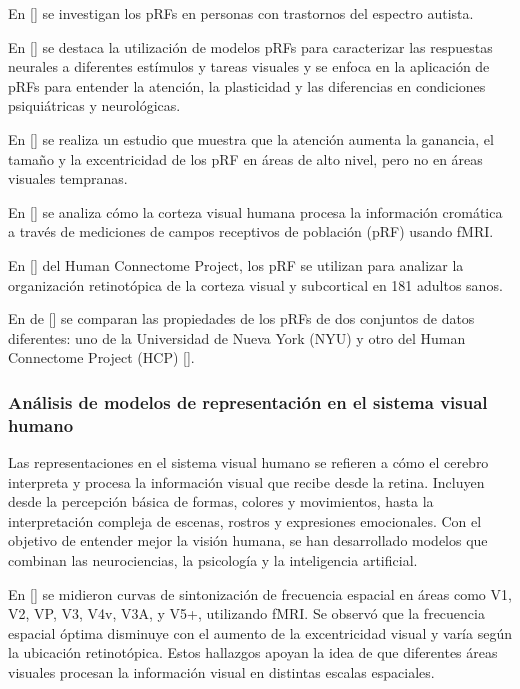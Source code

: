 En [\cite{schwarzkopf_larger_2014}] se investigan los pRFs en personas con trastornos del espectro autista. 

En [\cite{wandell_computational_2015}] se destaca la utilizaci\'on de modelos pRFs para caracterizar las respuestas neurales a diferentes est\'imulos y tareas visuales y se enfoca en la aplicación de pRFs para entender la atención, la plasticidad y las diferencias en condiciones psiquiátricas y neurológicas.

En [\cite{kay_attention_2015}] se realiza un estudio que muestra que la atención aumenta la ganancia, el tamaño y la excentricidad de los pRF en áreas de alto nivel, pero no en áreas visuales tempranas.

En [\cite{welbourne_population_2018}] se analiza cómo la corteza visual humana procesa la información cromática a través de mediciones de campos receptivos de población (pRF) usando fMRI. 

En [\cite{benson_human_2018}] del Human Connectome Project, los pRF se utilizan para analizar la organización retinotópica de la corteza visual y subcortical en 181 adultos sanos. 

En de [\cite{himmelberg_cross-dataset_2021}] se comparan las propiedades de los pRFs de dos conjuntos de datos diferentes: uno de la Universidad de Nueva York (NYU) y otro del Human Connectome Project (HCP) [\cite{benson_human_2018}].  



\subsubsection*{An\'alisis de modelos de representaci\'on en el sistema visual humano}

Las representaciones en el sistema visual humano se refieren a cómo el cerebro interpreta y procesa la información visual que recibe desde la retina. Incluyen desde la percepción básica de formas, colores y movimientos, hasta la interpretación compleja de escenas, rostros y expresiones emocionales. Con el objetivo de entender mejor la visi\'on humana, se han desarrollado modelos que combinan las neurociencias, la psicología y la inteligencia artificial.

En [\cite{henriksson_spatial_2008}]  se midieron curvas de sintonización de frecuencia espacial en áreas como V1, V2, VP, V3, V4v, V3A, y V5+, utilizando fMRI. Se observ\'o que la frecuencia espacial óptima disminuye con el aumento de la excentricidad visual y varía según la ubicación retinotópica. Estos hallazgos apoyan la idea de que diferentes áreas visuales procesan la información visual en distintas escalas espaciales.

